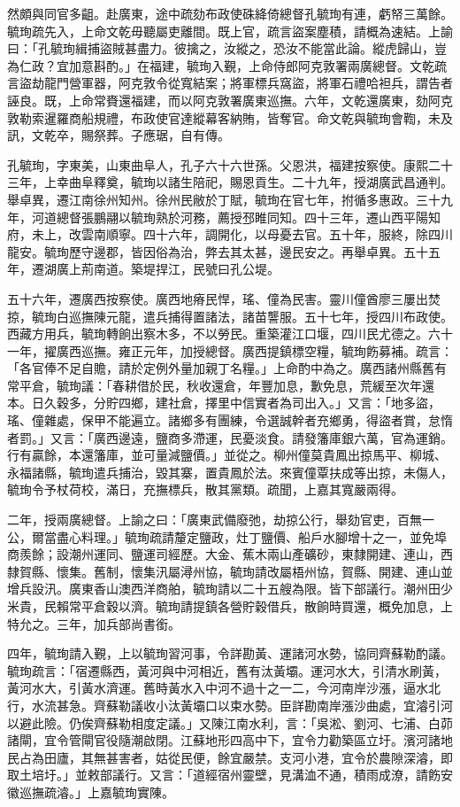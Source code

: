 \begin{pinyinscope}
然頗與同官多齟。赴廣東，途中疏劾布政使硃絳倚總督孔毓珣有連，虧帑三萬餘。毓珣疏先入，上命文乾毋聽屬吏離間。既上官，疏言盜案塵積，請概為速結。上諭曰：「孔毓珣緝捕盜賊甚盡力。彼擒之，汝縱之，恐汝不能當此論。縱虎歸山，豈為仁政？宜加意斟酌。」在福建，毓珣入覲，上命侍郎阿克敦署兩廣總督。文乾疏言盜劫龍門營軍器，阿克敦令從寬結案；將軍標兵窩盜，將軍石禮哈袒兵，謂告者誣良。既，上命常賚還福建，而以阿克敦署廣東巡撫。六年，文乾還廣東，劾阿克敦勒索暹羅商船規禮，布政使官達縱幕客納賄，皆奪官。命文乾與毓珣會鞫，未及訊，文乾卒，賜祭葬。子應琚，自有傳。

孔毓珣，字東美，山東曲阜人，孔子六十六世孫。父恩洪，福建按察使。康熙二十三年，上幸曲阜釋奠，毓珣以諸生陪祀，賜恩貢生。二十九年，授湖廣武昌通判。舉卓異，遷江南徐州知州。徐州民敝於丁賦，毓珣在官七年，拊循多惠政。三十九年，河道總督張鵬翮以毓珣熟於河務，薦授邳睢同知。四十三年，遷山西平陽知府，未上，改雲南順寧。四十六年，調開化，以母憂去官。五十年，服終，除四川龍安。毓珣歷守邊郡，皆因俗為治，弊去其太甚，邊民安之。再舉卓異。五十五年，遷湖廣上荊南道。築堤捍江，民號曰孔公堤。

五十六年，遷廣西按察使。廣西地瘠民悍，瑤、僮為民害。靈川僮酋廖三屢出焚掠，毓珣白巡撫陳元龍，遣兵捕得置諸法，諸苗讋服。五十七年，授四川布政使。西藏方用兵，毓珣轉餉出察木多，不以勞民。重築灌江口堰，四川民尤德之。六十一年，擢廣西巡撫。雍正元年，加授總督。廣西提鎮標空糧，毓珣飭募補。疏言：「各官俸不足自贍，請於定例外量加親丁名糧。」上命酌中為之。廣西諸州縣舊有常平倉，毓珣議：「春耕借於民，秋收還倉，年豐加息，歉免息，荒緩至次年還本。日久穀多，分貯四鄉，建社倉，擇里中信實者為司出入。」又言：「地多盜，瑤、僮雜處，保甲不能遍立。諸鄉多有團練，令選誠幹者充鄉勇，得盜者賞，怠惰者罰。」又言：「廣西邊遠，鹽商多滯運，民憂淡食。請發籓庫銀六萬，官為運銷。行有贏餘，本還籓庫，並可量減鹽價。」並從之。柳州僮莫貴鳳出掠馬平、柳城、永福諸縣，毓珣遣兵捕治，毀其寨，置貴鳳於法。來賓僮覃扶成等出掠，未傷人，毓珣令予杖荷校，滿日，充撫標兵，散其黨類。疏聞，上嘉其寬嚴兩得。

二年，授兩廣總督。上諭之曰：「廣東武備廢弛，劫掠公行，舉劾官吏，百無一公，爾當盡心料理。」毓珣疏請釐定鹽政，灶丁鹽價、船戶水腳增十之一，並免埠商羨餘；設潮州運同、鹽運司經歷。大金、蕉木兩山產礦砂，東隸開建、連山，西隸賀縣、懷集。舊制，懷集汛屬潯州協，毓珣請改屬梧州協，賀縣、開建、連山並增兵設汛。廣東香山澳西洋商舶，毓珣請以二十五艘為限。皆下部議行。潮州田少米貴，民賴常平倉穀以濟。毓珣請提鎮各營貯穀借兵，散餉時買還，概免加息，上特允之。三年，加兵部尚書銜。

四年，毓珣請入覲，上以毓珣習河事，令詳勘黃、運諸河水勢，協同齊蘇勒酌議。毓珣疏言：「宿遷縣西，黃河與中河相近，舊有汰黃壩。運河水大，引清水刷黃，黃河水大，引黃水濟運。舊時黃水入中河不過十之一二，今河南岸沙漲，逼水北行，水流甚急。齊蘇勒議收小汰黃壩口以束水勢。臣詳勘南岸漲沙曲處，宜濬引河以避此險。仍俟齊蘇勒相度定議。」又陳江南水利，言：「吳淞、劉河、七浦、白茆諸閘，宜令管閘官役隨潮啟閉。江蘇地形四高中下，宜令力勸築區立圩。濱河諸地民占為田廬，其無甚害者，姑從民便，餘宜嚴禁。支河小港，宜令於農隙深濬，即取土培圩。」並敕部議行。又言：「道經宿州靈壁，見溝洫不通，積雨成潦，請飭安徽巡撫疏濬。」上嘉毓珣實陳。


\end{pinyinscope}
